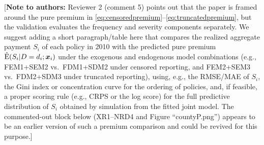 \documentclass[11pt]{article}
\newcommand{\authnote}[1]{{\color{red}[\textbf{Note to authors:} #1]}}
\begin{document}
\authnote{Reviewer 2 (comment 5) points out that the paper is framed around the pure premium in \eqref{eq:censoredpremium}--\eqref{eq:truncatedpremium}, but the validation evaluates the frequency and severity components separately. We suggest adding a short paragraph/table here that compares the realized aggregate payment $S_i$ of each policy in 2010 with the predicted pure premium $\hat{\rm E}(S_i|D=d_i;\bm{x}_i)$ under the exogenous and endogenous model combinations (e.g., FEM1+SEM2 vs.\ FDM1+SDM2 under censored reporting, and FEM2+SEM3 vs.\ FDM2+SDM3 under truncated reporting), using, e.g., the RMSE/MAE of $S_i$, the Gini index or concentration curve for the ordering of policies, and, if feasible, a proper scoring rule (e.g., CRPS or the log score) for the full predictive distribution of $S_i$ obtained by simulation from the fitted joint model. The commented-out block below (XR1--NRD4 and Figure ``countyP.png'') appears to be an earlier version of such a premium comparison and could be revived for this purpose.}
\end{document}
